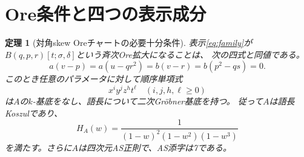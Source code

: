 \documentclass[11pt,a4paper]{ltjsarticle}
\newtheorem{theorem}{定理}[section]
\theoremstyle{definition}
\begin{document}
\section{Ore条件と四つの表示成分}
\begin{theorem}[対角skew Oreチャートの必要十分条件]\label{thm:ore-condition}
表示\eqref{eq:family}が
$B(q,p,r)[t;\sigma,\delta]$という斉次Ore拡大になることは、
次の四式と同値である。
\begin{equation}\label{eq:conditions}
\boxed{
 a(v-p)=a(u-qr^2)=b(v-r)=b(p^2-qs)=0.
}
\end{equation}
このとき任意のパラメータに対して順序単項式
\[
 x^iy^jz^ht^\ell\quad(i,j,h,\ell\geq0)
\]
は$A$の$k$-基底をなし、語長について二次Gr\"obner基底を持つ。
従って$A$は語長Koszulであり、
\begin{equation}\label{eq:hilbert}
H_A(w)=\frac1{(1-w)^2(1-w^2)(1-w^3)}
\end{equation}
を満たす。さらに$A$は四次元AS正則で、AS添字は7である。
\end{theorem}
\end{document}
